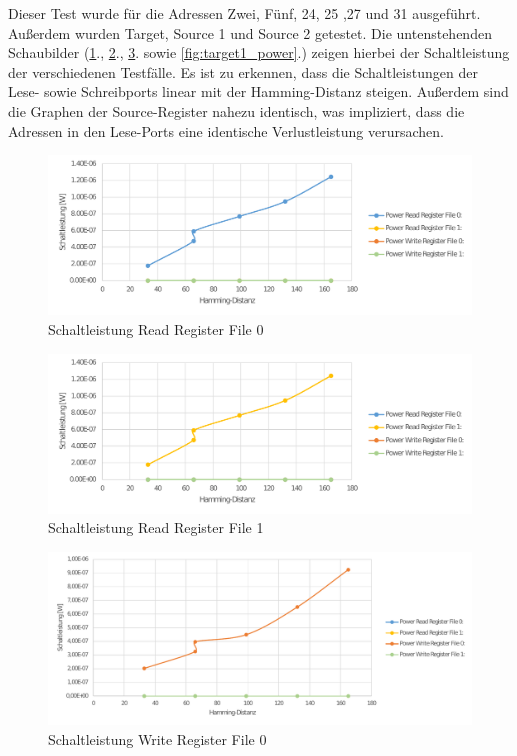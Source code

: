Dieser Test wurde für die Adressen Zwei, Fünf, 24, 25 ,27 und 31 ausgeführt. Außerdem wurden Target, Source 1 und Source 2 getestet. Die untenstehenden Schaubilder (\ref{fig:source0_power}., \ref{fig:source1_power}., \ref{fig:target0_power}. sowie \ref{fig:target1_power}.) zeigen hierbei der Schaltleistung der verschiedenen Testfälle. Es ist zu erkennen, dass die Schaltleistungen der Lese- sowie Schreibports linear mit der Hamming-Distanz steigen. Außerdem sind die Graphen der Source-Register nahezu identisch, was impliziert, dass die Adressen in den Lese-Ports eine identische Verlustleistung verursachen.\\

\begin{figure}[H]
	\centering
	\includegraphics[width=\textwidth]{fig/source1_power.pdf}
	\caption{Schaltleistung Read Register File 0}
	\label{fig:source0_power}
\end{figure}
\begin{figure}[H]
	\centering
	\includegraphics[width=\textwidth]{fig/source2_power.pdf}
	\caption{Schaltleistung Read Register File 1}
	\label{fig:source1_power}
\end{figure}
\begin{figure}[H]
	\centering
	\includegraphics[width=\textwidth]{fig/register_eval_target_port0.pdf}
	\caption{Schaltleistung Write Register File 0}
	\label{fig:target0_power}
\end{figure}
